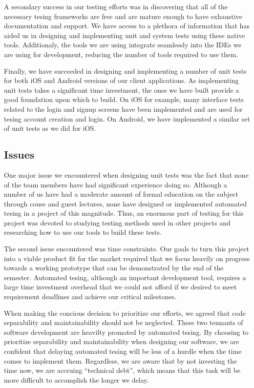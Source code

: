 A secondary success in our testing efforts was in discovering that all of the
necessary tesing frameworks are free and are mature enough to have exhaustive
documentation and support. We have access to a plethora of information that has
aided us in designing and implementing unit and system tests using these native
tools. Additionaly, the tools we are using integrate seamlessly into the IDEs we
are using for development, reducing the number of tools required to use them.

Finally, we have succeeded in designing and implementing a number of unit tests
for both iOS and Android versions of our client applications. As implementing
unit tests takes a significant time investment, the ones we have built provide a
good foundation upon which to build. On iOS for example, many interface tests
related to the login and signup screens have been implemented and are used for
tesing account creation and login. On Android, we have implemented a similar set
of unit tests as we did for iOS.


\subsection{Issues}

One major issue we encountered when designing unit tests was the fact that none
of the team members have had significant experience doing so. Although a number
of us have had a moderate amount of formal education on the subject through
couse and guest lectures, none have designed or implemented automated tesing in
a project of this magnitude. Thus, an enormous part of testing for this project
was devoted to studying testing methods used in other projects and researching
how to use our tools to build these tests.

The second issue encountered was time constraints. Our goals to turn this
project into a viable product fit for the market required that we focus heavily
on progress towards a working prototype that can be demonstrated by the end of
the semester. Automated tesing, although an important development tool, requires
a large time investment overhead that we could not afford if we desired to meet
requirement deadlines and achieve our critical milestones.

When making the concious decision to prioritize our efforts, we agreed that code
separability and maintainability should not be neglected. These two tennants of
software development are heavilty promoted by automated tesing. By choosing to
prioritize separability and maintainability when designing our software, we are
confident that delaying automated tesing will be less of a hurdle when the time
comes to implement them. Regardless, we are aware that by not investing the time
now, we are accruing ``technical debt'', which means that this task will be more
difficult to accomplish the longer we delay.


